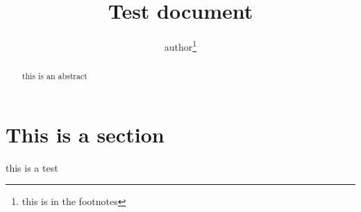 \documentclass[a4paper,12pt]{article}
\title{Test document}
\author{author\thanks{this is in the footnotes}}
\date{}
\begin{document}
\maketitle


\begin{abstract}
    this is an abstract
\end{abstract}

\section{This is a section}
this is a test
\end{document}
